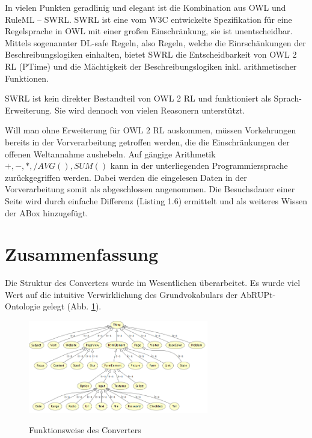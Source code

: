 \documentclass[runningheads,a4paper]{llncs}
\begin{document}
In vielen Punkten geradlinig und elegant ist die Kombination aus OWL und RuleML -- SWRL. 
SWRL ist eine vom W3C entwickelte Spezifikation für eine Regelsprache in OWL mit einer großen Einschränkung, sie ist unentscheidbar. 
Mittels sogenannter DL-safe Regeln, also Regeln, welche die Einrschänkungen der Beschreibungslogiken einhalten, bietet SWRL die Entscheidbarkeit von OWL 2 RL (PTime) und die Mächtigkeit der Beschreibungslogiken inkl. arithmetischer Funktionen. 

SWRL ist kein direkter Bestandteil von OWL 2 RL und funktioniert als Sprach-Erweiterung. 
Sie wird dennoch von vielen Reasonern unterstützt.

Will man ohne Erweiterung für OWL 2 RL auskommen, müssen Vorkehrungen bereits in der Vorverarbeitung getroffen werden, die die Einschränkungen der offenen Weltannahme aushebeln. 
Auf gängige Arithmetik \(+, -, *, / AVG(), SUM() \) kann in der unterliegenden Programmiersprache zurückgegriffen werden.
Dabei werden die eingelesen Daten in der Vorverarbeitung somit als abgeschlossen angenommen.
Die Besuchsdauer einer Seite wird durch einfache Differenz (Listing 1.6) ermittelt und als weiteres Wissen der ABox hinzugefügt.



\section{Zusammenfassung}
Die Struktur des Converters wurde im Wesentlichen überarbeitet.
Es wurde viel Wert auf die intuitive Verwirklichung des Grundvokabulars der AbRUPt-Ontologie gelegt (Abb. \ref{fig:onto}).

\begin{figure}
\caption{Funktionsweise des Converters}
\centering
\includegraphics[width=0.7\textwidth]{figures/tbox}
\label{fig:onto}
\end{figure}
\end{document}
